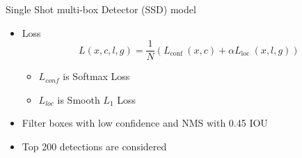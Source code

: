 \documentclass[10pt, aspectratio=169]{beamer}
\begin{document}
\begin{frame}[allowframebreaks]{Single Shot multi-box Detector (SSD) model}
\begin{multicols}{2}
        \begin{itemize}
            \item Loss
            $$L(x, c, l, g)=\frac{1}{N}\left(L_{\text {conf }}(x, c)+\alpha L_{\text {loc }}(x, l, g)\right)$$
            \begin{itemize}
                \item $L_{conf}$ is Softmax Loss
                \item $L_{loc}$ is Smooth $L_{1}$ Loss 
            \end{itemize}
            \item Filter boxes with low confidence and NMS with 0.45 IOU
            \item Top 200 detections are considered
            
        \end{itemize}
    \end{multicols}
\end{frame}
\end{document}

